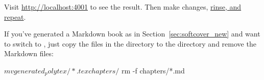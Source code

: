\noindent Visit \href{http://localhost:4001}{http://localhost:4001} to see the result. Then make changes, \href{http://www.urbandictionary.com/define.php?term=rinse%20repeat}{rinse, and repeat}.

If you've generated a Markdown book as in Section~\ref{sec:softcover_new} and want to switch to \PolyTeX, just copy the files in the  directory to the  directory and remove the Markdown files:

\begin{code}
$ mv generated_polytex/*.tex chapters/
$ rm -f chapters/*.md
\end{code}


